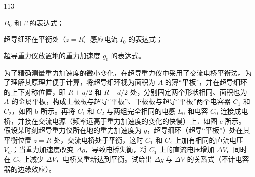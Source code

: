 \begin{problem}[第36届全国中学生物理竞赛决赛][超导重力仪与地下水重力变化]{113}
\begin{subproblem}
\begin{subsubproblem}
            $B_{0}$ 和 $\beta$ 的表达式；
        \end{subsubproblem}
        \begin{subsubproblem}
            超导细环在平衡处（$z = R$）感应电流 $I_{0}$ 的表达式；
        \end{subsubproblem}
        \begin{subsubproblem}
            超导重力仪放置地的重力加速度 $g_{0}$ 的表达式。
        \end{subsubproblem}
    \end{subproblem}
    \begin{subproblem}
        为了精确测量重力加速度的微小变化，在超导重力仪中采用了交流电桥平衡法。为了理解其原理并便于计算，将超导细环视为面积为 $A$ 的薄“平板”，并在超导细环的上下对称位置，即 $R + d/2$ 和 $R - d/2$ 处，分别固定两个形状相同、面积也为 $A$ 的金属平板，构成上极板与超导“平板”、下极板与超导“平板”两个电容器 $C_{1}$ 和 $C_{2}$，如图 b 所示。再将 $C_{1}$ 和 $C_{2}$ 与两组完全相同的电感 $L_{0}$ 和电容 $C_{0}$ 连接成电桥，并接在交流电源（频率远高于重力加速度的变化的快慢）上，如图 c 所示。假设某时刻超导重力仪所在地的重力加速度为 $g$，超导细环（超导“平板”）处在其平衡位置 $z = R$ 处，交流电桥处于平衡，这时 $C_{1}$ 和 $C_{2}$ 上加有相同的直流电压 $V_{C}$；当重力加速度改变 $\Delta g$，导致电桥失衡，将 $C_{1}$ 上的直流电压增加 $\Delta V$，同时在 $C_{2}$ 上减少 $\Delta V$，电桥又重新达到平衡。试给出 $\Delta g$ 与 $\Delta V$ 的关系式（不计电容器的边缘效应）。
    \end{subproblem}
\end{problem}